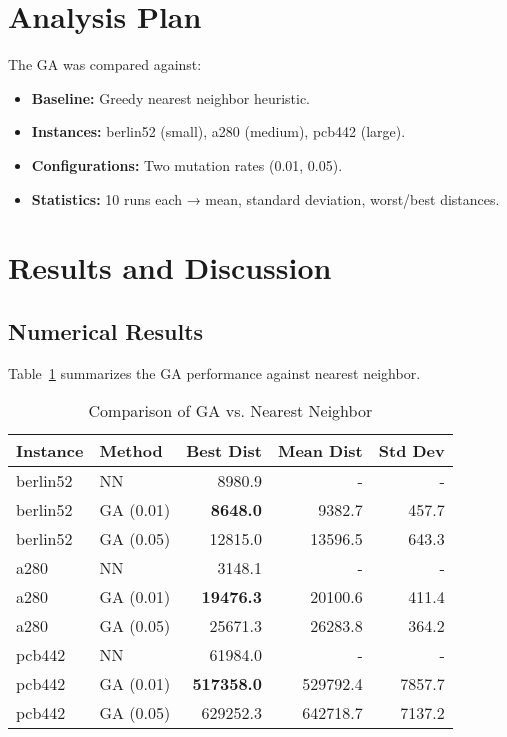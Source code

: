 \documentclass[conference]{IEEEtran}
\begin{document}
\section{Analysis Plan}
The GA was compared against:
\begin{itemize}
    \item \textbf{Baseline:} Greedy nearest neighbor heuristic.
    \item \textbf{Instances:} berlin52 (small), a280 (medium), pcb442 (large).
    \item \textbf{Configurations:} Two mutation rates (0.01, 0.05).
    \item \textbf{Statistics:} 10 runs each → mean, standard deviation, worst/best distances.
\end{itemize}

\section{Results and Discussion}
\subsection{Numerical Results}
Table~\ref{tab:results} summarizes the GA performance against nearest neighbor.

\begin{table}[h]
\centering
\caption{Comparison of GA vs. Nearest Neighbor}
\label{tab:results}
\begin{tabular}{|l|l|r|r|r|}
\hline
Instance & Method & Best Dist & Mean Dist & Std Dev \\
\hline
berlin52 & NN  & 8980.9  & -      & - \\
berlin52 & GA (0.01) & \textbf{8648.0} & 9382.7 & 457.7 \\
berlin52 & GA (0.05) & 12815.0 & 13596.5 & 643.3 \\
\hline
a280     & NN  & 3148.1  & -      & - \\
a280     & GA (0.01) & \textbf{19476.3} & 20100.6 & 411.4 \\
a280     & GA (0.05) & 25671.3 & 26283.8 & 364.2 \\
\hline
pcb442   & NN  & 61984.0 & -      & - \\
pcb442   & GA (0.01) & \textbf{517358.0} & 529792.4 & 7857.7 \\
pcb442   & GA (0.05) & 629252.3 & 642718.7 & 7137.2 \\
\hline
\end{tabular}
\end{table}
\end{document}
